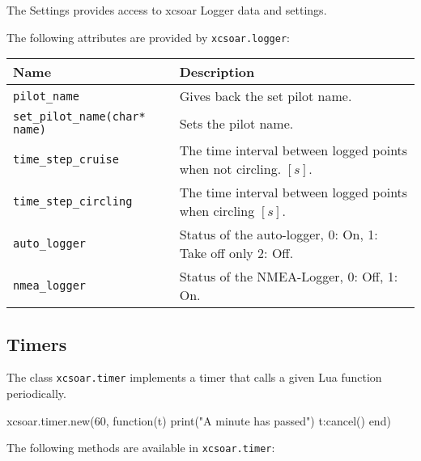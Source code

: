 The Settings provides access to xcsoar Logger data and settings.

The following attributes are provided by \verb|xcsoar.logger|:

\begin{maxipage}
\begin{tabularx}{1.9\textwidth}{l|X}
Name & Description \\
\hline\hline

\verb|pilot_name| & Gives back the set pilot name.\\

\hline

\verb|set_pilot_name(char* name)| &  Sets the pilot name.\\

\hline

\verb|time_step_cruise| & The time interval between logged 
points when not circling. $[s]$.\\

\hline

\verb|time_step_circling| &  The time interval between logged 
points when circling $[s]$.\\

\hline

\verb|auto_logger| &  Status of the auto-logger, 0: On, 1: Take off only
2: Off.\\

\hline

\verb|nmea_logger| &  Status of the NMEA-Logger, 0: Off, 1: On.\\

\end{tabularx}
\end{maxipage}

\subsection{Timers}

The class \verb|xcsoar.timer| implements a timer that calls a given
Lua function periodically.

\begin{lua}
xcsoar.timer.new(60, function(t)
  print("A minute has passed")
  t:cancel()
end)
\end{lua}

The following methods are available in \verb|xcsoar.timer|:

